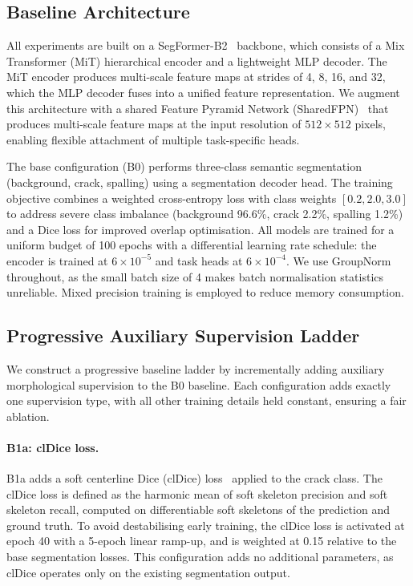 \documentclass[preprint,12pt]{elsarticle}
\begin{document}
\subsection{Baseline Architecture}
\label{sec:baseline_arch}

All experiments are built on a SegFormer-B2~\cite{xie2021segformer} backbone, which consists of a Mix Transformer (MiT) hierarchical encoder and a lightweight MLP decoder. The MiT encoder produces multi-scale feature maps at strides of 4, 8, 16, and 32, which the MLP decoder fuses into a unified feature representation. We augment this architecture with a shared Feature Pyramid Network (SharedFPN)~\cite{lin2017fpn} that produces multi-scale feature maps at the input resolution of $512 \times 512$ pixels, enabling flexible attachment of multiple task-specific heads.

The base configuration (B0) performs three-class semantic segmentation (background, crack, spalling) using a segmentation decoder head. The training objective combines a weighted cross-entropy loss with class weights $[0.2, 2.0, 3.0]$ to address severe class imbalance (background 96.6\%, crack 2.2\%, spalling 1.2\%) and a Dice loss for improved overlap optimisation. All models are trained for a uniform budget of 100 epochs with a differential learning rate schedule: the encoder is trained at $6 \times 10^{-5}$ and task heads at $6 \times 10^{-4}$. We use GroupNorm~\cite{wu2018groupnorm} throughout, as the small batch size of 4 makes batch normalisation statistics unreliable. Mixed precision training is employed to reduce memory consumption.

\subsection{Progressive Auxiliary Supervision Ladder}
\label{sec:aux_ladder}

We construct a progressive baseline ladder by incrementally adding auxiliary morphological supervision to the B0 baseline. Each configuration adds exactly one supervision type, with all other training details held constant, ensuring a fair ablation.

\paragraph{B1a: clDice loss.}
B1a adds a soft centerline Dice (clDice) loss~\cite{shit2021cldice} applied to the crack class. The clDice loss is defined as the harmonic mean of soft skeleton precision and soft skeleton recall, computed on differentiable soft skeletons of the prediction and ground truth. To avoid destabilising early training, the clDice loss is activated at epoch 40 with a 5-epoch linear ramp-up, and is weighted at 0.15 relative to the base segmentation losses. This configuration adds no additional parameters, as clDice operates only on the existing segmentation output.
\end{document}
